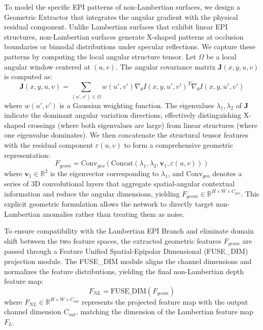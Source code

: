 To model the specific EPI patterns of non-Lambertian surfaces, we design a Geometric Extractor that integrates the angular gradient with the physical residual component. Unlike Lambertian surfaces that exhibit linear EPI structures, non-Lambertian surfaces generate X-shaped patterns at occlusion boundaries or bimodal distributions under specular reflections. We capture these patterns by computing the local angular structure tensor. Let $\Omega$ be a local angular window centered at $(u,v)$. The angular covariance matrix $\mathbf{J}(x,y,u,v)$ is computed as:
\begin{equation}
\label{eq:eq13}
\mathbf{J}(x,y,u,v) = \sum_{(u',v') \in \Omega} w(u',v') \nabla_{\theta} I(x,y,u',v')^T \nabla_{\theta} I(x,y,u',v')
\end{equation}
where $w(u',v')$ is a Gaussian weighting function. The eigenvalues $\lambda_1, \lambda_2$ of $\mathbf{J}$ indicate the dominant angular variation directions, effectively distinguishing X-shaped crossings (where both eigenvalues are large) from linear structures (where one eigenvalue dominates). We then concatenate the structural tensor features with the residual component $\varepsilon(u,v)$ to form a comprehensive geometric representation:
\begin{equation}
\label{eq:eq14}
F_{geom} = \text{Conv}_{geo} \left( \text{Concat}(\lambda_1, \lambda_2, \mathbf{v}_1, \varepsilon(u,v)) \right)
\end{equation}
where $\mathbf{v}_1 \in \mathbb{R}^2$ is the eigenvector corresponding to $\lambda_1$, and $\text{Conv}_{geo}$ denotes a series of 3D convolutional layers that aggregate spatial-angular contextual information and reduce the angular dimensions, yielding $F_{geom} \in \mathbb{R}^{H \times W \times C_{geo}}$. This explicit geometric formulation allows the network to directly target non-Lambertian anomalies rather than treating them as noise.

To ensure compatibility with the Lambertian EPI Branch and eliminate domain shift between the two feature spaces, the extracted geometric features $F_{geom}$ are passed through a Feature Unified Spatial-Epipolar Dimensional (FUSE_DIM) projection module. The FUSE_DIM module aligns the channel dimensions and normalizes the feature distributions, yielding the final non-Lambertian depth feature map:
\begin{equation}
\label{eq:eq15}
F_{NL} = \text{FUSE\_DIM}(F_{geom})
\end{equation}
where $F_{NL} \in \mathbb{R}^{H \times W \times C_{out}}$ represents the projected feature map with the output channel dimension $C_{out}$, matching the dimension of the Lambertian feature map $F_L$.

